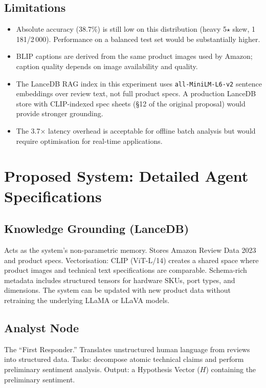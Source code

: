 \documentclass[12pt,a4paper]{article}
\begin{document}
\subsection{Limitations}

\begin{itemize}[leftmargin=*]
  \item Absolute accuracy (38.7\%) is still low on this distribution (heavy 5$\star$ skew,
    1\,181/2\,000). Performance on a balanced test set would be substantially higher.
  \item BLIP captions are derived from the same product images used by Amazon; caption
    quality depends on image availability and quality.
  \item The LanceDB RAG index in this experiment uses \texttt{all-MiniLM-L6-v2} sentence
    embeddings over review text, not full product specs. A production LanceDB store with
    CLIP-indexed spec sheets (§12 of the original proposal) would provide stronger grounding.
  \item The 3.7$\times$ latency overhead is acceptable for offline batch analysis but would
    require optimisation for real-time applications.
\end{itemize}

\section{Proposed System: Detailed Agent Specifications}

\subsection{Knowledge Grounding (LanceDB)}
Acts as the system's non-parametric memory. Stores Amazon Review Data 2023 and product
specs. Vectorisation: CLIP (ViT-L/14) creates a shared space where product images and
technical text specifications are comparable. Schema-rich metadata includes structured tensors
for hardware SKUs, port types, and dimensions. The system can be updated with new product
data without retraining the underlying LLaMA or LLaVA models.

\subsection{Analyst Node}
The ``First Responder.'' Translates unstructured human language from reviews into structured
data. Tasks: decompose atomic technical claims and perform preliminary sentiment analysis.
Output: a Hypothesis Vector ($H$) containing the preliminary sentiment.
\end{document}
